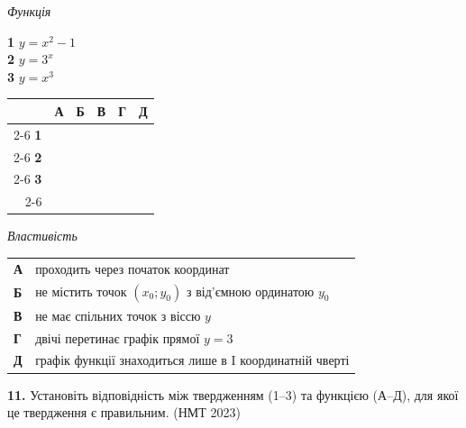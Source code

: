 \documentclass[14pt]{extarticle}
\newcommand{\nmtyear}[1]{\hfill{\small\color{yearcolor}(НМТ #1)}}
\begin{document}
\noindent
\begin{minipage}[t]{0.40\textwidth}
    \textit{Функція} \par \vspace{0.2cm}
    \textbf{1} \quad $y = x^2 - 1$ \\[0.2cm]
    \textbf{2} \quad $y = 3^x$ \\[0.2cm]
    \textbf{3} \quad $y = x^3$
    
    \vspace{0.5cm}
    
    \begingroup
    \setlength{\tabcolsep}{4pt}
    \renewcommand{\arraystretch}{1.2}
    \small
    \begin{tabular}{r|c|c|c|c|c|}
         \multicolumn{1}{c}{} & \multicolumn{1}{c}{\textbf{А}} & \multicolumn{1}{c}{\textbf{Б}} & \multicolumn{1}{c}{\textbf{В}} & \multicolumn{1}{c}{\textbf{Г}} & \multicolumn{1}{c}{\textbf{Д}} \\ \cline{2-6}
         \textbf{1} & & & & & \\ \cline{2-6}
         \textbf{2} & & & & & \\ \cline{2-6}
         \textbf{3} & & & & & \\ \cline{2-6}
    \end{tabular}
    \endgroup
\end{minipage}%
\hfill
\begin{minipage}[t]{0.55\textwidth}
    \textit{Властивість} \par \vspace{0.2cm}
    \begin{tabular}{l p{6.5cm}}
    \textbf{А} & проходить через початок координат \\
    \textbf{Б} & не містить точок $(x_0; y_0)$ з від'ємною ординатою $y_0$ \\
    \textbf{В} & не має спільних точок з віссю $y$ \\
    \textbf{Г} & двічі перетинає графік прямої $y = 3$ \\
    \textbf{Д} & графік функції знаходиться лише в I координатній чверті \\
    \end{tabular}
\end{minipage}

\vspace{0.7cm}

\noindent\textbf{11.} Установіть відповідність між твердженням (1--3) та функцією (А--Д), для якої це твердження є правильним. \nmtyear{2023}
\end{document}
